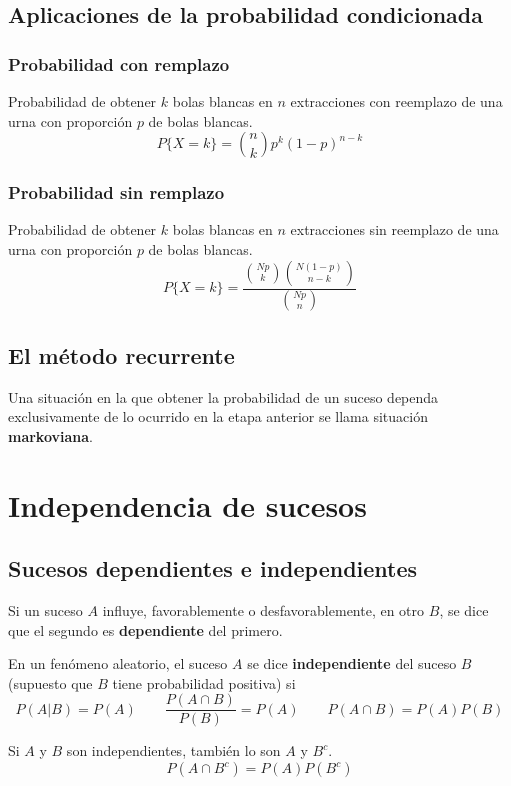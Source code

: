 \documentclass[12pt,a4paper,twoside]{memoir}
\theoremstyle{mystyle}
\begin{document}
\section{Aplicaciones de la probabilidad condicionada}

\subsection{Probabilidad con remplazo}

Probabilidad de obtener \(k\) bolas blancas en \(n\) extracciones con reemplazo de una urna con proporción \(p\) de bolas blancas.
\[
P\{X=k\}=\binom{n}{k} p^k (1-p)^{n-k}
\]

\subsection{Probabilidad sin remplazo}

Probabilidad de obtener \(k\) bolas blancas en \(n\) extracciones sin reemplazo de una urna con proporción \(p\) de bolas blancas.
\[
P\{X=k\}=\frac{\binom{Np}{k} \binom{N(1-p)}{n-k}}{\binom{Np}{n}}
\]

\section{El método recurrente} 

Una situación en la que obtener la probabilidad de un suceso dependa exclusivamente de lo ocurrido en la etapa anterior se llama situación \textbf{markoviana}.

\chapter{Independencia de  sucesos}

\section{Sucesos dependientes e independientes} 

Si un suceso \(A\) influye, favorablemente o desfavorablemente, en otro \(B\), se dice que el segundo es \textbf{dependiente} del primero.

En un fenómeno aleatorio, el suceso \(A\) se dice \textbf{independiente} del suceso \(B\) (supuesto que \(B\) tiene probabilidad positiva) si
\[
P(A|B) = P(A) \qquad \frac{P(A \cap B)}{P(B)} = P(A) \qquad P(A \cap B) = P(A)P(B)
\]

Si \(A\) y \(B\) son independientes, también lo son \(A\) y \(B^c\).
\[
P(A \cap B^c) = P(A)P(B^c)
\] 
\end{document}
